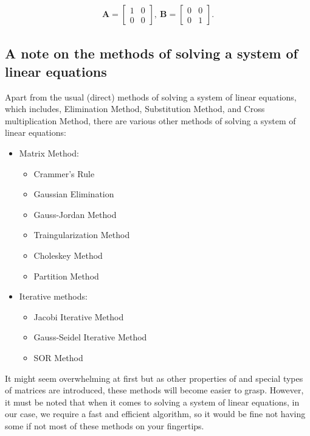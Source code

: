 \documentclass[12pt]{article}
\begin{document}
\begin{align}
\mathbf{A}= \begin{bmatrix} 1 & 0 \\ 0 & 0 \end{bmatrix},\ \mathbf{B}= \begin{bmatrix} 0 & 0 \\ 0 & 1 \end{bmatrix}.
\end{align}

\subsection{A note on the methods of solving a system of linear equations}

Apart from the usual (direct) methods of solving a system of linear equations, which includes, Elimination Method, Substitution Method, and Cross multiplication Method, there are various other methods of solving a system of linear equations:

\begin{itemize}
    \item Matrix Method:
    \begin{itemize}
        \item Crammer's Rule
        \item Gaussian Elimination
        \item Gauss-Jordan Method
        \item Traingularization Method
        \item Choleskey Method
        \item Partition Method
    \end{itemize}
    \item Iterative methods:
    \begin{itemize}
        \item Jacobi Iterative Method
        \item Gauss-Seidel Iterative Method
        \item SOR Method
    \end{itemize}
\end{itemize}

It might seem overwhelming at first but as other properties of and special types of matrices are introduced, these methods will become easier to grasp. However, it must be noted that when it comes to solving a system of linear equations, in our case, we require a fast and efficient algorithm, so it would be fine not having some if not most of these methods on your fingertips.
\end{document}
